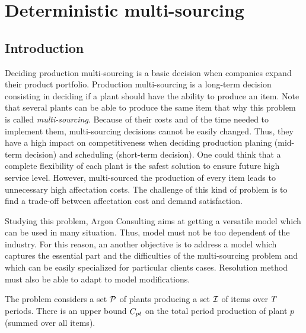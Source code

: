 \chapter{Deterministic multi-sourcing}
\label{chap:multi-sourcing:deterministic}

\section{Introduction}



Deciding production multi-sourcing is a basic decision when companies expand their product portfolio.
Production multi-sourcing is a long-term decision consisting in deciding if a plant should have the ability to produce an item.
Note that several plants can be able to produce the same item that why this problem is called \emph{multi-sourcing}.
Because of their costs and of the time needed to implement them, multi-sourcing decisions cannot be easily changed.
Thus, they have a high impact on competitiveness when deciding production planing (mid-term decision) and scheduling (short-term decision).
One could think that a complete flexibility of each plant is the safest solution to ensure future high service level.
However, multi-sourced the production of every item leads to unnecessary high affectation costs.
The challenge of this kind of problem is to find a trade-off between affectation cost and demand satisfaction.


Studying this problem, Argon Consulting aims at getting a versatile model which can be used in many situation.
Thus, model must not be too dependent of the industry.
For this reason, an another objective is to address a model which captures the essential part and the difficulties of the multi-sourcing problem and which can be easily specialized for particular clients cases.
Resolution method must also be able to adapt to model modifications.


\medskip


The problem considers a set $\mathcal{P}$ of plants producing a set $\mathcal{I}$ of items over $T$ periods.
There is an upper bound $C_{pt}$ on the total period production of plant $p$ (summed over all items).

